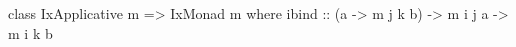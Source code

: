 \begin{code}
class IxApplicative m => IxMonad m where
  ibind :: (a -> m j k b) -> m i j a -> m i k b
\end{code}
